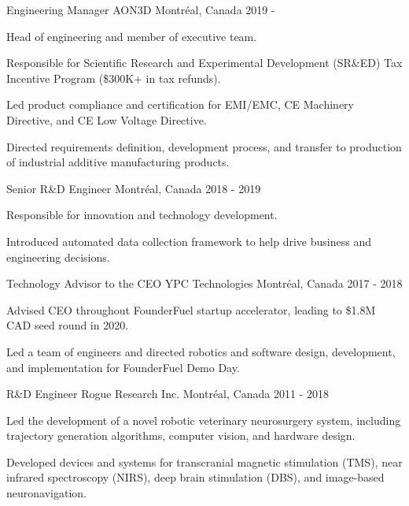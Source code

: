 \begin{cventries}

\cventry
{Engineering Manager}
{AON3D}
{Montréal, Canada}
{2019 - }
{
\begin{cvitems}
\item{Head of engineering and member of executive team.}
\item{Responsible for Scientific Research and Experimental Development (SR\&ED) Tax Incentive Program (\$300K+ in tax refunds).}
\item{Led product compliance and certification for EMI/EMC, CE Machinery Directive, and CE Low Voltage Directive.}
\item{Directed requirements definition, development process, and transfer to production of industrial additive manufacturing products.}
\end{cvitems}
}

\cventry
{Senior R\&D Engineer}
{}
{Montréal, Canada}
{2018 - 2019}
{
\begin{cvitems}
\item{Responsible for innovation and technology development.}
\item{Introduced automated data collection framework to help drive business and engineering decisions.}
\end{cvitems}
}

\cventry
{Technology Advisor to the CEO}
{YPC Technologies}
{Montréal, Canada}
{2017 - 2018}
{
\begin{cvitems}
\item{Advised CEO throughout FounderFuel startup accelerator, leading to \$1.8M CAD seed round in 2020.}
\item{Led a team of engineers and directed robotics and software design, development, and implementation for FounderFuel Demo Day.}
\end{cvitems}
}

\cventry
{R\&D Engineer}
{Rogue Research Inc.}
{Montréal, Canada}
{2011 - 2018}
{
\begin{cvitems}
\item{Led the development of a novel robotic veterinary neurosurgery system, including trajectory generation algorithms, computer vision, and hardware design.}
\item{Developed devices and systems for transcranial magnetic stimulation (TMS), near infrared spectroscopy (NIRS), deep brain stimulation (DBS), and image-based neuronavigation.}
\end{cvitems}
}

\end{cventries}
